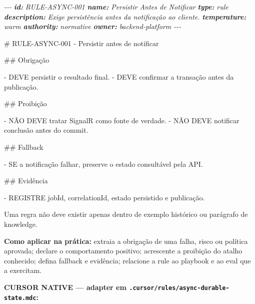 \documentclass[
  10pt,
  a4paper,
  oneside]{book}
\newenvironment{Shaded}{}{}
\newcommand{\AnnotationTok}[1]{\textcolor[rgb]{0.38,0.63,0.69}{\textbf{\textit{#1}}}}
\newcommand{\CommentTok}[1]{\textcolor[rgb]{0.38,0.63,0.69}{\textit{#1}}}
\newcommand{\FunctionTok}[1]{\textcolor[rgb]{0.02,0.16,0.49}{#1}}
\newcommand{\NormalTok}[1]{#1}
\newcommand{\SpecialStringTok}[1]{\textcolor[rgb]{0.73,0.40,0.53}{#1}}
\begin{document}
\begin{Shaded}
\begin{Highlighting}[]
\CommentTok{{-}{-}{-}}
\AnnotationTok{id:}\CommentTok{ RULE{-}ASYNC{-}001}
\AnnotationTok{name:}\CommentTok{ Persistir Antes de Notificar}
\AnnotationTok{type:}\CommentTok{ rule}
\AnnotationTok{description:}\CommentTok{ Exige persistência antes da notificação ao cliente.}
\AnnotationTok{temperature:}\CommentTok{ warm}
\AnnotationTok{authority:}\CommentTok{ normative}
\AnnotationTok{owner:}\CommentTok{ backend{-}platform}
\CommentTok{{-}{-}{-}}

\FunctionTok{\# RULE{-}ASYNC{-}001 {-} Persistir antes de notificar}

\FunctionTok{\#\# Obrigação}

\SpecialStringTok{{-} }\NormalTok{DEVE persistir o resultado final.}
\SpecialStringTok{{-} }\NormalTok{DEVE confirmar a transação antes da publicação.}

\FunctionTok{\#\# Proibição}

\SpecialStringTok{{-} }\NormalTok{NÃO DEVE tratar SignalR como fonte de verdade.}
\SpecialStringTok{{-} }\NormalTok{NÃO DEVE notificar conclusão antes do commit.}

\FunctionTok{\#\# Fallback}

\SpecialStringTok{{-} }\NormalTok{SE a notificação falhar, preserve o estado consultável pela API.}

\FunctionTok{\#\# Evidência}

\SpecialStringTok{{-} }\NormalTok{REGISTRE jobId, correlationId, estado persistido e publicação.}
\end{Highlighting}
\end{Shaded}

Uma regra não deve existir apenas dentro de exemplo histórico ou
parágrafo de knowledge.

\textbf{Como aplicar na prática:} extraia a obrigação de uma falha,
risco ou política aprovada; declare o comportamento positivo; acrescente
a proibição do atalho conhecido; defina fallback e evidência; relacione
a rule ao playbook e ao eval que a exercitam.

\textbf{CURSOR NATIVE --- adapter em
\texttt{.cursor/rules/async-durable-state.mdc}:}
\end{document}
